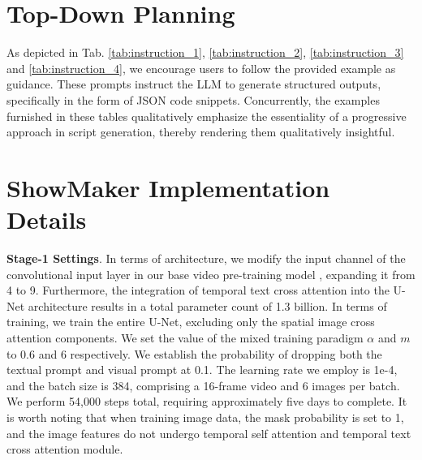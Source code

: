 \appendix









\section{Top-Down Planning}
\label{sub:planning}

As depicted in Tab. \ref{tab:instruction_1}, \ref{tab:instruction_2}, \ref{tab:instruction_3} and \ref{tab:instruction_4}, we encourage users to follow the provided example as guidance. 
These prompts instruct the LLM to generate structured outputs, specifically in the form of JSON code snippets. 
Concurrently, the examples furnished in these tables qualitatively emphasize the essentiality of a progressive approach in script generation, thereby rendering them qualitatively insightful.

\section{ShowMaker Implementation Details}
\textbf{Stage-1 Settings}.
In terms of architecture, we modify the input channel of the convolutional input layer in our base video pre-training model \cite{Wang2023LAVIEHV}, expanding it from 4 to 9. 
Furthermore, the integration of temporal text cross attention into the U-Net architecture results in a total parameter count of 1.3 billion. 
In terms of training, we train the entire U-Net, excluding only the spatial image cross attention components.
We set the value of the mixed training paradigm $\alpha$ and $m$ to 0.6 and 6 respectively. 
We establish the probability of dropping both the textual prompt and visual prompt at 0.1.
The learning rate we employ is 1e-4, and the batch size is 384, comprising a 16-frame video and 6 images per batch. 
We perform 54,000 steps total, requiring approximately five days to complete. 
It is worth noting that when training image data, the mask probability is set to 1, and the image features do not undergo temporal self attention and temporal text cross attention module.

